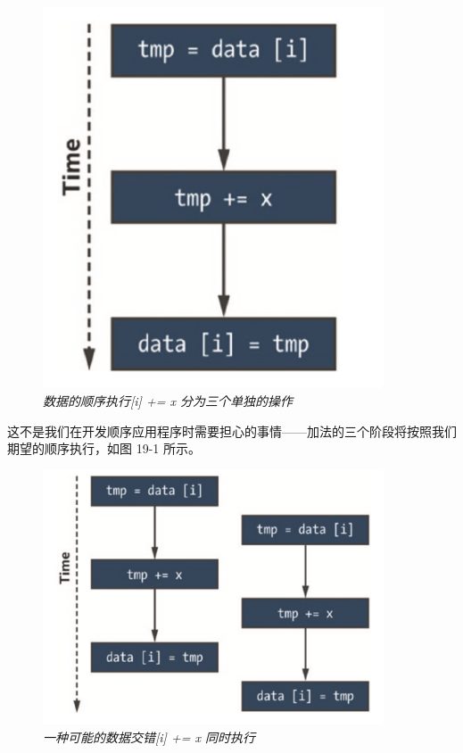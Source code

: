 \begin{figure}[H]
	\centering
	\includegraphics[width=0.9\textwidth]{figs/F19.1.png}
	\caption{\textit{数据的顺序执行[i] += x 分为三个单独的操作 }}
\end{figure}

这不是我们在开发顺序应用程序时需要担心的事情——加法的三个阶段将按照我们期望的顺序执行，如图 19-1 所示。

\begin{figure}[H]
	\centering
	\includegraphics[width=0.9\textwidth]{figs/F19.2.png}
	\caption{\textit{一种可能的数据交错[i] += x 同时执行 }}
\end{figure}

